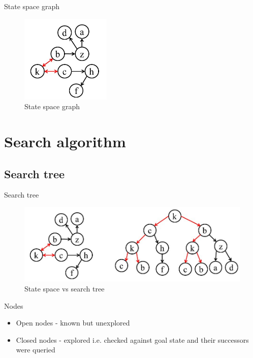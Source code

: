 \documentclass{beamer}
\begin{document}
\begin{frame}{State space graph}
\pause
\begin{figure}
\centering
	\includegraphics[width=0.6\linewidth]{state_space_graph.png}
	\caption{State space graph}
\end{figure}
\end{frame}

\section{Search algorithm}

\subsection{Search tree}

\begin{frame}{Search tree}

\begin{figure}
\centering
	\includegraphics[width=\linewidth]{state_space_vs_search_tree.png}
	\caption{State space vs search tree}
\end{figure}

\end{frame}

\begin{frame}{Nodes}

\begin{itemize}
	\item Open nodes - known but unexplored
	\item Closed nodes - explored i.e. checked against goal state and their successors were queried
\end{itemize}

\end{frame}
\end{document}
